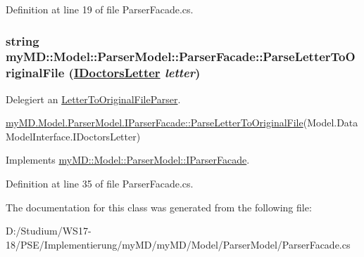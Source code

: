Definition at line 19 of file Parser\-Facade.cs.\hypertarget{classmy_m_d_1_1_model_1_1_parser_model_1_1_parser_facade_b00612cc050463e46a4078ec61ef5bae}{
\subsubsection[ParseLetterToOriginalFile]{\setlength{\rightskip}{0pt plus 5cm}string my\-MD::Model::Parser\-Model::Parser\-Facade::Parse\-Letter\-To\-Original\-File (\hyperlink{interfacemy_m_d_1_1_model_interface_1_1_data_model_interface_1_1_i_doctors_letter}{IDoctors\-Letter} {\em letter})}}
\label{d6/d36/classmy_m_d_1_1_model_1_1_parser_model_1_1_parser_facade_b00612cc050463e46a4078ec61ef5bae}


Delegiert an \hyperlink{classmy_m_d_1_1_model_1_1_parser_model_1_1_letter_to_original_file_parser}{Letter\-To\-Original\-File\-Parser}. 

\hyperlink{interfacemy_m_d_1_1_model_1_1_parser_model_1_1_i_parser_facade_b00612cc050463e46a4078ec61ef5bae}{my\-MD.Model.Parser\-Model.IParser\-Facade::Parse\-Letter\-To\-Original\-File}(Model.Data\-Model\-Interface.IDoctors\-Letter) 

Implements \hyperlink{interfacemy_m_d_1_1_model_1_1_parser_model_1_1_i_parser_facade_b00612cc050463e46a4078ec61ef5bae}{my\-MD::Model::Parser\-Model::IParser\-Facade}.

Definition at line 35 of file Parser\-Facade.cs.

The documentation for this class was generated from the following file:\begin{CompactItemize}
\item 
D:/Studium/WS17-18/PSE/Implementierung/my\-MD/my\-MD/Model/Parser\-Model/Parser\-Facade.cs\end{CompactItemize}
